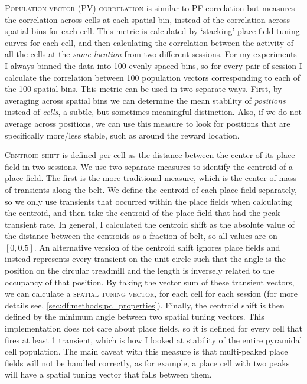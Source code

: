\textsc{Population vector (PV) correlation} is similar to PF correlation but measures the correlation across cells at each spatial bin, instead of the correlation across spatial bins for each cell.
This metric is calculated by `stacking' place field tuning curves for each cell, and then calculating the correlation between the activity of all the cells at the \textit{same location} from two different sessions.
For my experiments I always binned the data into 100 evenly spaced bins, so for every pair of session I calculate the correlation between 100 population vectors corresponding to each of the 100 spatial bins.
This metric can be used in two separate ways.
First, by averaging across spatial bins we can determine the mean stability of \textit{positions} instead of \textit{cells}, a subtle, but sometimes meaningful distinction.
Also, if we do not average across positions, we can use this measure to look for positions that are specifically more/less stable, such as around the reward location.

\textsc{Centroid shift} is defined per cell as the distance between the center of its place field in two sessions.
We use two separate measures to identify the centroid of a place field.
The first is the more traditional measure, which is the center of mass of transients along the belt.
We define the centroid of each place field separately, so we only use transients that occurred within the place fields when calculating the centroid, and then take the centroid of the place field that had the peak transient rate.
In general, I calculated the centroid shift as the absolute value of the distance between the centroids as a fraction of belt, so all values are on $[0, 0.5]$.
An alternative version of the centroid shift ignores place fields and instead represents every transient on the unit circle such that the angle is the position on the circular treadmill and the length is inversely related to the occupancy of that position.
By taking the vector sum of these transient vectors, we can calculate a \textsc{spatial tuning vector}, for each cell for each session (for more details see, \autoref{sec:df:methods:pc_properties}).
Finally, the centroid shift is then defined by the minimum angle between two spatial tuning vectors.
This implementation does not care about place fields, so it is defined for every cell that fires at least 1 transient, which is how I looked at stability of the entire pyramidal cell population.
The main caveat with this measure is that multi-peaked place fields will not be handled correctly, as for example, a place cell with two peaks will have a spatial tuning vector that falls between them.

